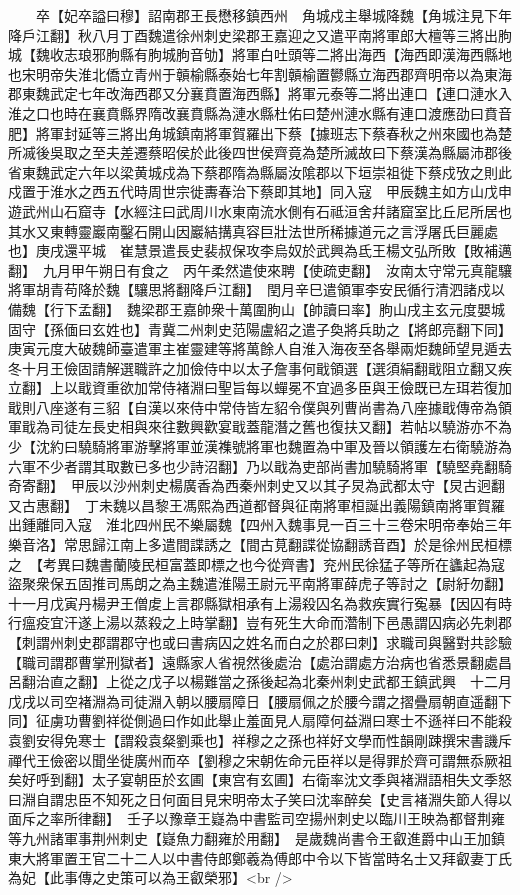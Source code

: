 　　卒【妃卒謚曰穆】詔南郡王長懋移鎮西州　角城戍主舉城降魏【角城注見下年降戶江翻】秋八月丁酉魏遣徐州刺史梁郡王嘉迎之又遣平南將軍郎大檀等三將出胊城【魏收志琅邪朐縣有胊城胊音劬】將軍白吐頭等二將出海西【海西即漢海西縣地也宋明帝失淮北僑立青州于贑榆縣泰始七年割贑榆置鬰縣立海西郡齊明帝以為東海郡東魏武定七年改海西郡又分襄賁置海西縣】將軍元泰等二將出連口【連口漣水入淮之口也時在襄賁縣界隋改襄賁縣為漣水縣杜佑曰楚州漣水縣有連口渡應劭曰賁音肥】將軍封延等三將出角城鎮南將軍賀羅出下蔡【據班志下蔡春秋之州來國也為楚所㓕後吳取之至夫差遷蔡昭侯於此後四世侯齊竟為楚所滅故曰下蔡漢為縣屬沛郡後省東魏武定六年以梁黄城戍為下蔡郡隋為縣屬汝隂郡以下垣崇祖徙下蔡戍攷之則此戍置于淮水之西五代時周世宗徙夀春治下蔡即其地】同入寇　甲辰魏主如方山戊申遊武州山石窟寺【水經注曰武周川水東南流水側有石祗洹舍幷諸窟室比丘尼所居也其水又東轉靈巖南鑿石開山因巖結搆真容巨壯法世所稀據道元之言浮屠氏巨麗處也】庚戌還平城　崔慧景遣長史裴叔保攻李烏奴於武興為氐王楊文弘所敗【敗補邁翻】　九月甲午朔日有食之　丙午柔然遣使來聘【使疏吏翻】　汝南太守常元真龍驤將軍胡青苟降於魏【驤思將翻降戶江翻】　閏月辛巳遣領軍李安民循行清泗諸戍以備魏【行下孟翻】　魏梁郡王嘉帥衆十萬圍朐山【帥讀曰率】胊山戌主玄元度嬰城固守【孫偭曰玄姓也】青冀二州刺史范陽盧紹之遣子奐將兵助之【將郎亮翻下同】庚寅元度大破魏師臺遣軍主崔靈建等將萬餘人自淮入海夜至各舉兩炬魏師望見遁去　冬十月王儉固請解選職許之加儉侍中以太子詹事何戢領選【選須絹翻戢阻立翻又疾立翻】上以戢資重欲加常侍褚淵曰聖旨每以蟬冕不宜過多臣與王儉既已左珥若復加戢則八座遂有三貂【自漢以來侍中常侍皆左貂令僕與列曹尚書為八座據戢傳帝為領軍戢為司徒左長史相與來往數興歡宴戢蓋龍潛之舊也復扶又翻】若帖以驍游亦不為少【沈約曰驍騎將軍游擊將軍並漢襍號將軍也魏置為中軍及晉以領護左右衛驍游為六軍不少者謂其取數已多也少詩沼翻】乃以戢為吏部尚書加驍騎將軍【驍堅堯翻騎奇寄翻】　甲辰以沙州刺史楊廣香為西秦州刺史又以其子炅為武都太守【炅古迥翻又古惠翻】　丁未魏以昌黎王馮熙為西道都督與征南將軍桓誕出義陽鎮南將軍賀羅出鍾離同入寇　淮北四州民不樂屬魏【四州入魏事見一百三十三卷宋明帝奉始三年樂音洛】常思歸江南上多遣間諜誘之【間古莧翻諜從協翻誘音酉】於是徐州民桓標之　【考異曰魏書蘭陵民桓富蓋即標之也今從齊書】兖州民徐猛子等所在蠭起為寇盜聚衆保五固推司馬朗之為主魏遣淮陽王尉元平南將軍薛虎子等討之【尉紆勿翻】　十一月戊寅丹楊尹王僧䖍上言郡縣獄相承有上湯殺囚名為救疾實行寃暴【因囚有時行瘟疫宜汗遂上湯以蒸殺之上時掌翻】豈有死生大命而濳制下邑愚謂囚病必先刺郡【刺謂州刺史郡謂郡守也或曰書病囚之姓名而白之於郡曰刺】求職司與醫對共診驗【職司謂郡曹掌刑獄者】遠縣家人省視然後處治【處治謂處方治病也省悉景翻處昌呂翻治直之翻】上從之戊子以楊難當之孫後起為北秦州刺史武都王鎮武興　十二月戊戌以司空褚淵為司徒淵入朝以腰扇障日【腰扇佩之於腰今謂之摺疊扇朝直遥翻下同】征虜功曹劉祥從側過曰作如此舉止羞面見人扇障何益淵曰寒士不遜祥曰不能殺袁劉安得免寒士【謂殺袁粲劉乘也】祥穆之之孫也祥好文學而性韻剛踈撰宋書譏斥禪代王儉密以聞坐徙廣州而卒【劉穆之宋朝佐命元臣祥以是得罪於齊可謂無忝厥祖矣好呼到翻】太子宴朝臣於玄圃【東宫有玄圃】右衛率沈文季與褚淵語相失文季怒曰淵自謂忠臣不知死之日何面目見宋明帝太子笑曰沈率醉矣【史言褚淵失節人得以面斥之率所律翻】　壬子以豫章王嶷為中書監司空揚州刺史以臨川王映為都督荆雍等九州諸軍事荆州刺史【嶷魚力翻雍於用翻】　是歲魏尚書令王叡進爵中山王加鎮東大將軍置王官二十二人以中書侍郎鄭羲為傅郎中令以下皆當時名士又拜叡妻丁氏為妃【此事傳之史策可以為王叡榮邪】<br />
